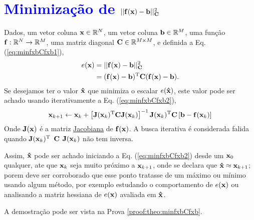 \newpage


\section{\textcolor{blue}{Minimização de $||\VECTOR{f}(\VECTOR{x})-\VECTOR{b}||_{\MATRIX{C}}^2$}
}

\begin{theorem}\label{theo:minfxbCfxb}
Dados,
um vetor coluna $\VECTOR{x}\in \mathbb{R}^N$, 
um vetor coluna $\VECTOR{b}\in \mathbb{R}^M$,  
uma função $\VECTOR{f}:\mathbb{R}^{N} \rightarrow \mathbb{R}^{M}$, 
uma matriz diagonal $\MATRIX{C} \in \mathbb{R}^{M\times M}$, e 
definida a Eq. (\ref{eq:minfxbCfxb1}),
\begin{align}\label{eq:minfxbCfxb1}
e(\VECTOR{x}) & = ||\VECTOR{f}(\VECTOR{x})-\VECTOR{b}||_{\MATRIX{C}}^2 \\
              & = (\VECTOR{f}(\VECTOR{x})-\VECTOR{b})^{\transpose}\MATRIX{C}(\VECTOR{f}(\VECTOR{x})-\VECTOR{b}).
\end{align}
Se desejamos ter o valor $\VECTOR{\hat{x}}$ que minimiza o escalar $e(\VECTOR{\hat{x}})$,
este valor pode ser achado usando iterativamente a Eq. (\ref{eq:minfxbCfxb2}),
\begin{equation}\label{eq:minfxbCfxb2}
\VECTOR{x}_{k+1} \leftarrow \VECTOR{x}_k+
\left[ \MATRIX{J}(\VECTOR{x}_k)^{\transpose}\MATRIX{C} \MATRIX{J}(\VECTOR{x}_k) \right]^{-1}
 \MATRIX{J}(\VECTOR{x}_k)^{\transpose}\MATRIX{C}\left[\VECTOR{b}-\VECTOR{f}(\VECTOR{x}_k)\right]
\end{equation}
Onde  $\MATRIX{J}(\VECTOR{x})$ é a matriz \hyperref[def:jacobian]{Jacobiana} \cite{Jacobian} de $\VECTOR{f}(\VECTOR{x})$.
A busca iterativa é considerada falida quando 
$\MATRIX{J}(\VECTOR{x}_k)^{\transpose}$ $\MATRIX{C}$ $\MATRIX{J}(\VECTOR{x}_k)$
não tem inversa.

Assim, $\VECTOR{\hat{x}}$ pode ser achado iniciando a Eq. (\ref{eq:minfxbCfxb2}) desde um $\VECTOR{x}_{0}$ qualquer, ate que $\VECTOR{x}_{k}$ seja muito próximo a $\VECTOR{x}_{k+1}$,
onde se declara que $\VECTOR{\hat{x}} \approx \VECTOR{x}_{k+1}$; porem deve ser corroborado
que esse ponto tratasse de um máximo ou mínimo usando algum método, por exemplo estudando o comportamento 
de $e(\VECTOR{x})$ ou analisando a matriz hessiana de $e(\VECTOR{x})$ avaliada em $\VECTOR{\hat{x}}$.

A demostração pode ser vista na Prova \ref{proof:theo:minfxbCfxb}.
\end{theorem}

